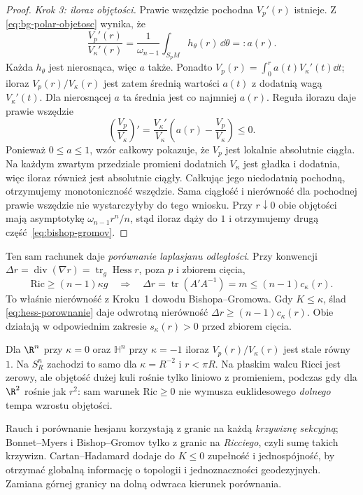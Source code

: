 \begin{proof}
\emph{Krok 3: iloraz objętości.} Prawie wszędzie
pochodna $V_p'(r)$ istnieje. Z
\eqref{eq:bg-polar-objetosc} wynika, że
\[
 \frac{V_p'(r)}{V_\kappa'(r)}
 =\frac1{\omega_{n-1}}
          \int_{S_pM}h_\theta(r)\,\dd\theta
 =:a(r).
\]
Każda $h_\theta$ jest nierosnąca,
więc $a$ także. Ponadto
$V_p(r)=\int_0^r a(t)V_\kappa'(t)\dd t$;
iloraz $V_p(r)/V_\kappa(r)$ jest zatem
średnią wartości $a(t)$ z dodatnią wagą
$V_\kappa'(t)$. Dla nierosnącej $a$
ta średnia jest co najmniej $a(r)$.
Reguła ilorazu daje prawie wszędzie
\[
 \left(\frac{V_p}{V_\kappa}\right)'
 =\frac{V_\kappa'}{V_\kappa}
   \left(a(r)-\frac{V_p}{V_\kappa}\right)\leq0.
\]
Ponieważ $0\leq a\leq1$, wzór całkowy pokazuje, że
$V_p$ jest lokalnie absolutnie ciągła. Na każdym zwartym
przedziale promieni dodatnich $V_\kappa$ jest gładka
i dodatnia, więc iloraz również jest absolutnie ciągły.
Całkując jego niedodatnią pochodną, otrzymujemy
monotoniczność wszędzie.
Sama ciągłość i nierówność dla pochodnej prawie wszędzie
nie wystarczyłyby do tego wniosku. Przy $r\downarrow0$ obie objętości
mają asymptotykę $\omega_{n-1}r^n/n$,
stąd iloraz dąży do $1$ i otrzymujemy
drugą część~\eqref{eq:bishop-gromov}.
\end{proof}

Ten sam rachunek daje \emph{porównanie laplasjanu
odległości}. Przy konwencji
$\Delta r=\operatorname{div}(\nabla r)
=\operatorname{tr}_g\operatorname{Hess}r$,
poza $p$ i zbiorem cięcia,
\begin{equation}\label{eq:laplasjan-porownanie}
 \mathrm{Ric}\geq(n-1)\kappa g
 \quad\Longrightarrow\quad
 \Delta r=\operatorname{tr}(A'A^{-1})
       =m\leq(n-1)c_\kappa(r).
\end{equation}
To właśnie nierówność z Kroku~1 dowodu
Bishopa--Gromowa. Gdy $K\leq\kappa$, ślad
\eqref{eq:hess-porownanie} daje odwrotną
nierówność $\Delta r\geq(n-1)c_\kappa(r)$.
Obie działają w odpowiednim zakresie
$s_\kappa(r)>0$ przed zbiorem cięcia.

\begin{przyklad}
Dla $\R^n$ przy $\kappa=0$ oraz
$\mathbb H^n$ przy $\kappa=-1$ iloraz
$V_p(r)/V_\kappa(r)$ jest stale równy $1$.
Na $S_R^n$ zachodzi to samo dla
$\kappa=R^{-2}$ i $r<\pi R$.
Na płaskim walcu Ricci jest zerowy, ale
objętość dużej kuli rośnie tylko liniowo
z promieniem, podczas gdy dla $\R^2$
rośnie jak $r^2$: sam warunek $\mathrm{Ric}\geq0$
nie wymusza euklidesowego \emph{dolnego}
tempa wzrostu objętości.
\end{przyklad}

\begin{uwaga}
Rauch i porównanie hesjanu korzystają z granic
na każdą \emph{krzywiznę sekcyjną}; Bonnet--Myers
i Bishop--Gromov tylko z granic na \emph{Ricciego},
czyli sumę takich krzywizn. Cartan--Hadamard
dodaje do $K\leq0$ zupełność i jednospójność,
by otrzymać globalną informację o topologii
i jednoznaczności geodezyjnych. Zamiana górnej
granicy na dolną odwraca kierunek porównania.
\end{uwaga}


